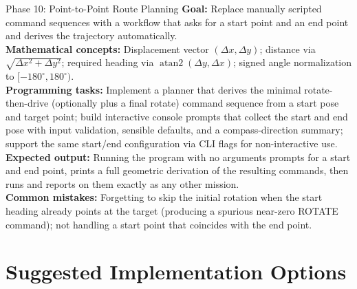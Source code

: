 \documentclass[12pt]{report}
\begin{document}
\begin{phasebox}{Phase 10: Point-to-Point Route Planning}
\textbf{Goal:} Replace manually scripted command sequences with a workflow that asks for a start point and an end point and derives the trajectory automatically. \\
\textbf{Mathematical concepts:} Displacement vector $(\Delta x, \Delta y)$; distance via $\sqrt{\Delta x^2 + \Delta y^2}$; required heading via $\operatorname{atan2}(\Delta y, \Delta x)$; signed angle normalization to $[-180^\circ, 180^\circ)$. \\
\textbf{Programming tasks:} Implement a planner that derives the minimal rotate-then-drive (optionally plus a final rotate) command sequence from a start pose and target point; build interactive console prompts that collect the start and end pose with input validation, sensible defaults, and a compass-direction summary; support the same start/end configuration via CLI flags for non-interactive use. \\
\textbf{Expected output:} Running the program with no arguments prompts for a start and end point, prints a full geometric derivation of the resulting commands, then runs and reports on them exactly as any other mission. \\
\textbf{Common mistakes:} Forgetting to skip the initial rotation when the start heading already points at the target (producing a spurious near-zero ROTATE command); not handling a start point that coincides with the end point.
\end{phasebox}

\chapter{Suggested Implementation Options}
\end{document}

